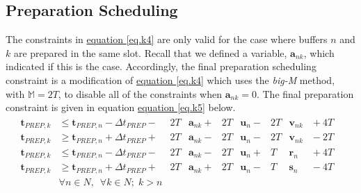 \subsection{Preparation Scheduling}\label{SS.prepsched}
The constraints in \hyperref[eq.k4]{equation \ref*{eq.k4}} are only valid for
the case where buffers $n$ and $k$ are prepared in the same slot.
Recall that we defined a variable, $\boldsymbol{a}_{nk}$, which indicated if
this is the case.
Accordingly, the final preparation scheduling constraint is a modification of
\hyperref[eq.k4]{equation \ref*{eq.k4}} which uses the \emph{big-M} method,
with $\mathbb{M} = 2T$, to disable all of the constraints when
$\boldsymbol{a}_{nk} = 0$.
The final preparation constraint is given in equation
\hyperref[eq.k5]{equation \ref*{eq.k5}} below. 
\begin{equation}
    \begin{split}
        \begin{alignedat}{14}
            \boldsymbol{t}_{\mathit{PREP},k}
            &\le \boldsymbol{t}_{\mathit{PREP},n}
            - \Delta t_{\mathit{PREP}} {}-{} & 2T &\boldsymbol{a}_{nk}
            {}+{} & 2T &\boldsymbol{u}_{n}
            {}-{} & 2T &\boldsymbol{v}_{nk} & {}+{} 4T&\\
            \boldsymbol{t}_{\mathit{PREP},k}
            &\ge \boldsymbol{t}_{\mathit{PREP},n}
            + \Delta t_{\mathit{PREP}} {}+{} & 2T &\boldsymbol{a}_{nk}
            {}-{} & 2T &\boldsymbol{u}_{n}
            {}-{} & 2T &\boldsymbol{v}_{nk} & {}-{} 2T&\\
            \boldsymbol{t}_{\mathit{PREP},k}
            &\le \boldsymbol{t}_{\mathit{PREP},n}
            - \Delta t_{\mathit{PREP}} {}-{} & 2T &\boldsymbol{a}_{nk}
            {}-{} & 2T &\boldsymbol{u}_{n}
            {}+{} & T &\boldsymbol{r}_{n} & {}+{} 4T&\\
            \boldsymbol{t}_{\mathit{PREP},k}
            &\ge \boldsymbol{t}_{\mathit{PREP},n}
            + \Delta t_{\mathit{PREP}} {}+{} & 2T &\boldsymbol{a}_{nk}
            {}+{} & 2T &\boldsymbol{u}_{n}
            {}-{} & T &\boldsymbol{s}_{n} & {}-{} 4T&\\
            &\forall n \in N, \enspace \forall k \in N; \; k > n
            \end{alignedat}            
    \end{split}
    \label{eq.k5}
\end{equation}

